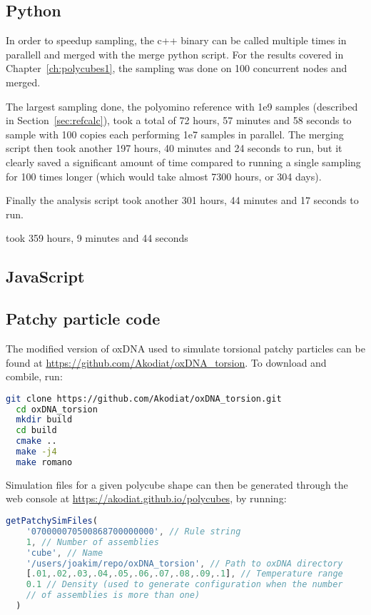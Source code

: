 \subsection{Python}
In order to speedup sampling, the c++ binary can be called multiple times in parallell and merged with the merge python script. For the results covered in Chapter~\ref{ch:polycubes1}, the sampling was done on 100 concurrent nodes and merged.

The largest sampling done, the polyomino reference with 1e9 samples (described in Section~\ref{sec:refcalc}), took a total of 72 hours, 57 minutes and 58 seconds to sample with 100 copies each performing 1e7 samples in parallel. The merging script then took another 197 hours, 40 minutes and 24 seconds to run, but it clearly saved a significant amount of time compared to running a single sampling for 100 times longer (which would take almost 7300 hours, or 304 days).

Finally the analysis script took another 301 hours, 44 minutes and 17 seconds to run.

took 359 hours, 9 minutes and 44 seconds

\subsection{JavaScript}

\subsection{Patchy particle code}
\label{sec:appendix_patchy}
The modified version of oxDNA used to simulate torsional patchy particles can be found at \url{https://github.com/Akodiat/oxDNA_torsion}. To download and combile, run:

\begin{lstlisting}[language=bash]
  git clone https://github.com/Akodiat/oxDNA_torsion.git
  cd oxDNA_torsion
  mkdir build
  cd build
  cmake ..
  make -j4
  make romano
\end{lstlisting}

Simulation files for a given polycube shape can then be generated through the web console at \url{https://akodiat.github.io/polycubes}, by running:

\begin{lstlisting}[language=JavaScript]
  getPatchySimFiles(
    '070000070500868700000000', // Rule string
    1, // Number of assemblies
    'cube', // Name
    '/users/joakim/repo/oxDNA_torsion', // Path to oxDNA directory
    [.01,.02,.03,.04,.05,.06,.07,.08,.09,.1], // Temperature range
    0.1 // Density (used to generate configuration when the number
    // of assemblies is more than one)
  )
\end{lstlisting}


